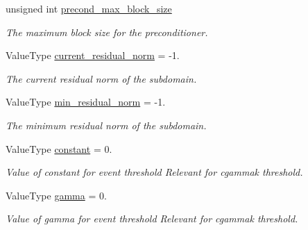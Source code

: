 \begin{DoxyCompactItemize}
unsigned int \hyperlink{structschwz_1_1Metadata_a93978e9e4d28fac4ee80fdb5c77a7074}{precond\+\_\+max\+\_\+block\+\_\+size}
\begin{DoxyCompactList}\small\item\em The maximum block size for the preconditioner. \end{DoxyCompactList}\item 
\mbox{\label{structschwz_1_1Metadata_a3436901bfcd4f17f65ed3acb810a7909}} 
Value\+Type \hyperlink{structschwz_1_1Metadata_a3436901bfcd4f17f65ed3acb810a7909}{current\+\_\+residual\+\_\+norm} = -\/1.
\begin{DoxyCompactList}\small\item\em The current residual norm of the subdomain. \end{DoxyCompactList}\item 
\mbox{\label{structschwz_1_1Metadata_a04bd75fb60c4085481a3fc3e96269452}} 
Value\+Type \hyperlink{structschwz_1_1Metadata_a04bd75fb60c4085481a3fc3e96269452}{min\+\_\+residual\+\_\+norm} = -\/1.
\begin{DoxyCompactList}\small\item\em The minimum residual norm of the subdomain. \end{DoxyCompactList}\item 
\mbox{\label{structschwz_1_1Metadata_aed13edafeb7b695ab134a594957b08da}} 
Value\+Type \hyperlink{structschwz_1_1Metadata_aed13edafeb7b695ab134a594957b08da}{constant} = 0.
\begin{DoxyCompactList}\small\item\em Value of constant for event threshold Relevant for cgammak threshold. \end{DoxyCompactList}\item 
\mbox{\label{structschwz_1_1Metadata_a3e6d7acc51f4dd26e50b2dc902a92d1e}} 
Value\+Type \hyperlink{structschwz_1_1Metadata_a3e6d7acc51f4dd26e50b2dc902a92d1e}{gamma} = 0.
\begin{DoxyCompactList}\small\item\em Value of gamma for event threshold Relevant for cgammak threshold. \end{DoxyCompactList}\item 
\mbox{\label{structschwz_1_1Metadata_a9c12719250c5c44ca3096af308d93e4c}} 

\end{DoxyCompactItemize}
